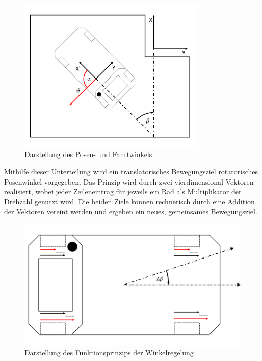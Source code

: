 		\begin{figure}[H]
			\centering
			\includegraphics[width=0.8\textwidth]{Bilder/posenundfahrtwinkel.png}
			\caption{Darstellung des Posen- und Fahrtwinkels}
			\label{fig: Posen- und Fahrtwinkel}
		\end{figure}
		
		Mithilfe dieser Unterteilung wird ein translatorisches Bewegungsziel rotatorisches Posenwinkel vorgegeben. Das Prinzip wird durch zwei vierdimensional Vektoren realisiert, wobei jeder Zeileneintrag für jeweils ein Rad als Multiplikator der Drehzahl genutzt wird. Die beiden Ziele können rechnerisch durch eine Addition der Vektoren vereint werden und ergeben ein neues, gemeinsames Bewegungsziel.     
		
		\begin{figure}[H]
			\centering
			\includegraphics[width=1.0\textwidth]{Bilder/winkelregelung.png}
			\caption{Darstellung des Funktionsprinzips der Winkelregelung}
			\label{fig: Winkelregelung}
		\end{figure}
		

